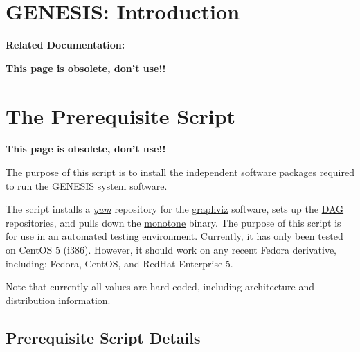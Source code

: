 \documentclass[12pt]{article}
\begin{document}
\section*{GENESIS: Introduction}

{\bf Related Documentation:}

{\bf This page is obsolete, don't use!!}

\section*{The Prerequisite Script}

{\bf This page is obsolete, don't use!!}

The purpose of this script is to install the independent software packages required to run the GENESIS system software.

The script installs a \href{http://www.centos.org/docs/5/html/yum/}{\it yum} repository for the \href{http://www.graphviz.org/}{graphviz} software, sets up the \href{http://dag.wieers.com/rpm/}{DAG} repositories, and pulls down the \href{http://monotone.ca/}{monotone} binary. The purpose of this script is for use in an automated testing environment. Currently, it has only been tested on CentOS 5 (i386). However, it should work on any recent Fedora derivative, including: Fedora, CentOS, and RedHat Enterprise 5.

Note that currently all values are hard coded, including architecture and distribution information.

\subsection*{Prerequisite Script Details}
\end{document}
